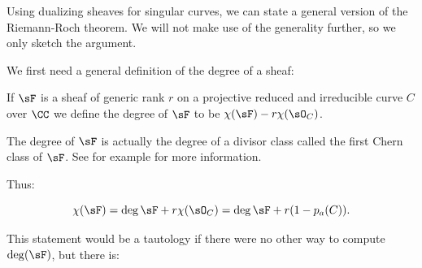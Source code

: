 Using dualizing sheaves for singular curves, we can
state a general version of the Riemann-Roch theorem.  We will not make use of the generality further, so we only sketch the argument.

We first need a general definition of the degree of a sheaf:

\begin{definition}
 If $\sF$ is a sheaf of generic rank $r$ on a projective reduced and irreducible curve $C$ over $\CC$ we define the degree
 of $\sF$ to be $\chi(\sF) -r\chi(\sO_C)$.
\end{definition}

\begin{fact}
The degree of $\sF$ is actually the degree of a divisor class called the first Chern class of $\sF$. See
for example \cite[Chapter 5]{3264}
for more information. 
\end{fact}

Thus:
\begin{proposition}\label{general RR without duality}
$$
 \chi(\sF) = \deg \sF + r\chi(\sO_C) = \deg \sF + r(1-p_a(C)).
 $$
\end{proposition}
 
This statement would be
a tautology if there were no other way to compute $\deg(\sF)$, but there is:

